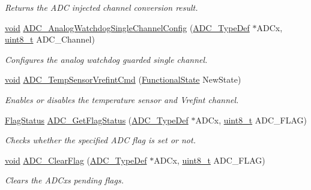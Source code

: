 \begin{DoxyCompactItemize}
\begin{DoxyCompactList}\small\item\em Returns the A\+DC injected channel conversion result. \end{DoxyCompactList}\item 
\hyperlink{usb__devapi_8h_afabf60e7f57651d6d595a02c75f07cd0}{void} \hyperlink{group___a_d_c___exported___functions_ga03cef3d12292ffa2b8520524d5b0226c}{A\+D\+C\+\_\+\+Analog\+Watchdog\+Single\+Channel\+Config} (\hyperlink{struct_a_d_c___type_def}{A\+D\+C\+\_\+\+Type\+Def} $\ast$A\+D\+Cx, \hyperlink{_p_e___types_8h_aba7bc1797add20fe3efdf37ced1182c5}{uint8\+\_\+t} A\+D\+C\+\_\+\+Channel)
\begin{DoxyCompactList}\small\item\em Configures the analog watchdog guarded single channel. \end{DoxyCompactList}\item 
\hyperlink{usb__devapi_8h_afabf60e7f57651d6d595a02c75f07cd0}{void} \hyperlink{group___a_d_c___exported___functions_ga848682e2d7d3de9f8cf03ffa4c11f0b5}{A\+D\+C\+\_\+\+Temp\+Sensor\+Vrefint\+Cmd} (\hyperlink{agilefox_2library_2inc_2stm32f10x__type_8h_ac9a7e9a35d2513ec15c3b537aaa4fba1}{Functional\+State} New\+State)
\begin{DoxyCompactList}\small\item\em Enables or disables the temperature sensor and Vrefint channel. \end{DoxyCompactList}\item 
\hyperlink{agilefox_2library_2inc_2stm32f10x__type_8h_a89136caac2e14c55151f527ac02daaff}{Flag\+Status} \hyperlink{group___a_d_c___exported___functions_gaa12546e51ec905c90a3aada432bd4633}{A\+D\+C\+\_\+\+Get\+Flag\+Status} (\hyperlink{struct_a_d_c___type_def}{A\+D\+C\+\_\+\+Type\+Def} $\ast$A\+D\+Cx, \hyperlink{_p_e___types_8h_aba7bc1797add20fe3efdf37ced1182c5}{uint8\+\_\+t} A\+D\+C\+\_\+\+F\+L\+AG)
\begin{DoxyCompactList}\small\item\em Checks whether the specified A\+DC flag is set or not. \end{DoxyCompactList}\item 
\hyperlink{usb__devapi_8h_afabf60e7f57651d6d595a02c75f07cd0}{void} \hyperlink{group___a_d_c___exported___functions_gaf34f36798f811b4a41321ea2d12118d4}{A\+D\+C\+\_\+\+Clear\+Flag} (\hyperlink{struct_a_d_c___type_def}{A\+D\+C\+\_\+\+Type\+Def} $\ast$A\+D\+Cx, \hyperlink{_p_e___types_8h_aba7bc1797add20fe3efdf37ced1182c5}{uint8\+\_\+t} A\+D\+C\+\_\+\+F\+L\+AG)
\begin{DoxyCompactList}\small\item\em Clears the A\+D\+Cx\textquotesingle{}s pending flags. \end{DoxyCompactList}\end{DoxyCompactItemize}


